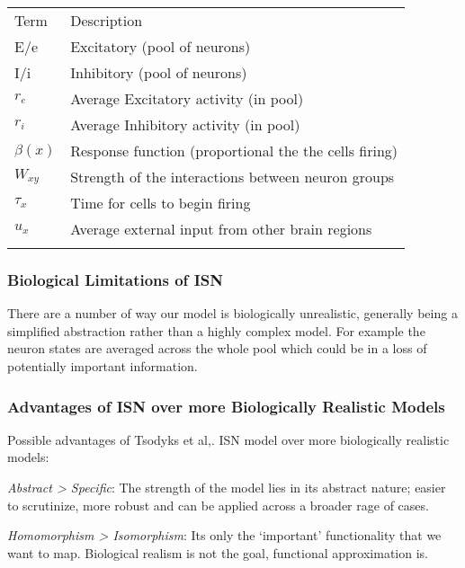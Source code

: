 \documentclass[11pt]{article}
\begin{document}
    \begin{longtable}[]{@{}ll@{}}
\toprule
Term & Description \\ \addlinespace
\midrule
\endhead
E/e & Excitatory (pool of neurons) \\ \addlinespace
I/i & Inhibitory (pool of neurons) \\ \addlinespace
\(r_e\) & Average Excitatory activity (in pool) \\ \addlinespace
\(r_i\) & Average Inhibitory activity (in pool) \\ \addlinespace
\(\beta (x)\) & Response function (proportional the the cells
firing) \\ \addlinespace
\(W_{xy}\) & Strength of the interactions between neuron
groups \\ \addlinespace
\(\tau _x\) & Time for cells to begin firing \\ \addlinespace
\(u_x\) & Average external input from other brain
regions \\ \addlinespace
\bottomrule
\end{longtable}

    \hypertarget{biological-limitations-of-isn}{%
\subsubsection{Biological Limitations of
ISN}\label{biological-limitations-of-isn}}

    There are a number of way our model is biologically unrealistic,
generally being a simplified abstraction rather than a highly complex
model. For example the neuron states are averaged across the whole pool
which could be in a loss of potentially important information.

    \hypertarget{advantages-of-isn-over-more-biologically-realistic-models}{%
\subsubsection{Advantages of ISN over more Biologically Realistic
Models}\label{advantages-of-isn-over-more-biologically-realistic-models}}

    Possible advantages of Tsodyks et al,. ISN model over more biologically
realistic models:

\emph{Abstract \textgreater{} Specific}: The strength of the model lies
in its abstract nature; easier to scrutinize, more robust and can be
applied across a broader rage of cases.

\emph{Homomorphism \textgreater{} Isomorphism}: Its only the `important'
functionality that we want to map. Biological realism is not the goal,
functional approximation is.
\end{document}
